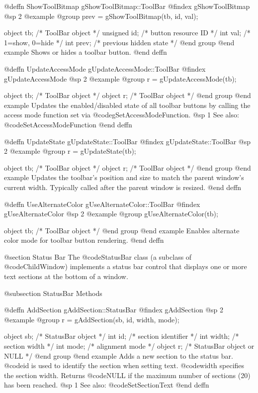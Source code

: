 @deffn {ShowToolBitmap} gShowToolBitmap::ToolBar
@findex gShowToolBitmap
@sp 2
@example
@group
prev = gShowToolBitmap(tb, id, val);

object    tb;     /*  ToolBar object           */
unsigned  id;     /*  button resource ID        */
int       val;    /*  1=show, 0=hide            */
int       prev;   /*  previous hidden state     */
@end group
@end example
Shows or hides a toolbar button.
@end deffn



@deffn {UpdateAccessMode} gUpdateAccessMode::ToolBar
@findex gUpdateAccessMode
@sp 2
@example
@group
r = gUpdateAccessMode(tb);

object  tb;   /*  ToolBar object  */
object  r;    /*  ToolBar object  */
@end group
@end example
Updates the enabled/disabled state of all toolbar buttons by calling
the access mode function set via @code{gSetAccessModeFunction}.
@sp 1
See also:  @code{SetAccessModeFunction}
@end deffn



@deffn {UpdateState} gUpdateState::ToolBar
@findex gUpdateState::ToolBar
@sp 2
@example
@group
r = gUpdateState(tb);

object  tb;   /*  ToolBar object  */
object  r;    /*  ToolBar object  */
@end group
@end example
Updates the toolbar's position and size to match the parent window's
current width.  Typically called after the parent window is resized.
@end deffn



@deffn {UseAlternateColor} gUseAlternateColor::ToolBar
@findex gUseAlternateColor
@sp 2
@example
@group
gUseAlternateColor(tb);

object  tb;   /*  ToolBar object  */
@end group
@end example
Enables alternate color mode for toolbar button rendering.
@end deffn




@section Status Bar
The @code{StatusBar} class (a subclass of @code{ChildWindow}) implements
a status bar control that displays one or more text sections at the
bottom of a window.

@subsection StatusBar Methods



@deffn {AddSection} gAddSection::StatusBar
@findex gAddSection
@sp 2
@example
@group
r = gAddSection(sb, id, width, mode);

object  sb;      /*  StatusBar object           */
int     id;      /*  section identifier          */
int     width;   /*  section width               */
int     mode;    /*  alignment mode              */
object  r;       /*  StatusBar object or NULL    */
@end group
@end example
Adds a new section to the status bar.  @code{id} is used to identify the
section when setting text.  @code{width} specifies the section width.
Returns @code{NULL} if the maximum number of sections (20) has been
reached.
@sp 1
See also:  @code{SetSectionText}
@end deffn



